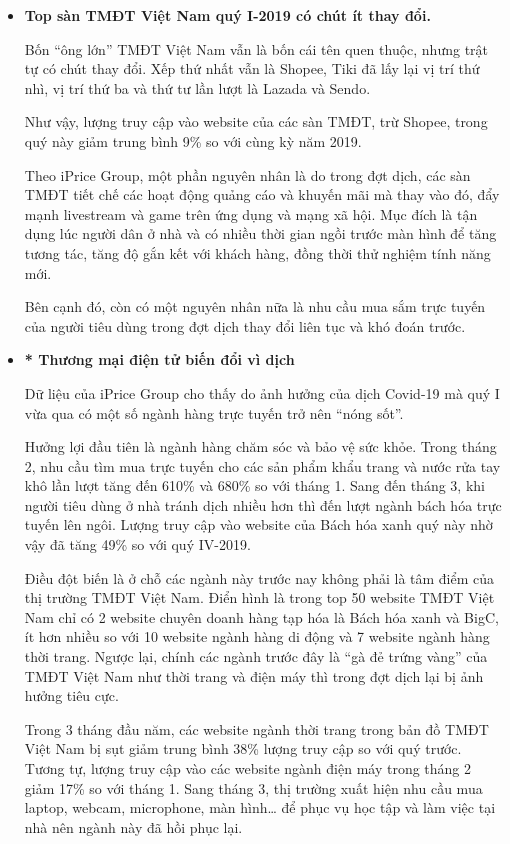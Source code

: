 \documentclass[12pt]{article}
\begin{document}
\begin{itemize}
    \item \textbf{Top sàn TMĐT Việt Nam quý I-2019 có chút ít thay đổi.}  
    
Bốn “ông lớn” TMĐT Việt Nam vẫn là bốn cái tên quen thuộc, nhưng trật tự có chút thay đổi. Xếp thứ nhất vẫn là Shopee, Tiki đã lấy lại vị trí thứ nhì, vị trí thứ ba và thứ tư lần lượt là Lazada và Sendo.

Như vậy, lượng truy cập vào website của các sàn TMĐT, trừ Shopee, trong quý này giảm trung bình 9\% so với cùng kỳ năm 2019.

Theo iPrice Group, một phần nguyên nhân là do trong đợt dịch, các sàn TMĐT tiết chế các hoạt động quảng cáo và khuyến mãi mà thay vào đó, đẩy mạnh livestream và game trên ứng dụng và mạng xã hội. Mục đích là tận dụng lúc người dân ở nhà và có nhiều thời gian ngồi trước màn hình để tăng tương tác, tăng độ gắn kết với khách hàng, đồng thời thử nghiệm tính năng mới.

Bên cạnh đó, còn có một nguyên nhân nữa là nhu cầu mua sắm trực tuyến của người tiêu dùng trong đợt dịch thay đổi liên tục và khó đoán trước.
\item \textbf{* Thương mại điện tử biến đổi vì dịch}

Dữ liệu của iPrice Group cho thấy do ảnh hưởng của dịch Covid-19 mà quý I vừa qua có một số ngành hàng trực tuyến trở nên “nóng sốt”.

Hưởng lợi đầu tiên là ngành hàng chăm sóc và bảo vệ sức khỏe. Trong tháng 2, nhu cầu tìm mua trực tuyến cho các sản phẩm khẩu trang và nước rửa tay khô lần lượt tăng đến 610\% và 680\% so với tháng 1. Sang đến tháng 3, khi người tiêu dùng ở nhà tránh dịch nhiều hơn thì đến lượt ngành bách hóa trực tuyến lên ngôi. Lượng truy cập vào website của Bách hóa xanh quý này nhờ vậy đã tăng 49\% so với quý IV-2019.

Điều đột biến là ở chỗ các ngành này trước nay không phải là tâm điểm của thị trường TMĐT Việt Nam. Điển hình là trong top 50 website TMĐT Việt Nam chỉ có 2 website chuyên doanh hàng tạp hóa là Bách hóa xanh và BigC, ít hơn nhiều so với 10 website ngành hàng di động và 7 website ngành hàng thời trang. Ngược lại, chính các ngành trước đây là “gà đẻ trứng vàng” của TMĐT Việt Nam như thời trang và điện máy thì trong đợt dịch lại bị ảnh hưởng tiêu cực.

Trong 3 tháng đầu năm, các website ngành thời trang trong bản đồ TMĐT Việt Nam bị sụt giảm trung bình 38\% lượng truy cập so với quý trước. Tương tự, lượng truy cập vào các website ngành điện máy trong tháng 2 giảm 17\% so với tháng 1. Sang tháng 3, thị trường xuất hiện nhu cầu mua laptop, webcam, microphone, màn hình… để phục vụ học tập và làm việc tại nhà nên ngành này đã hồi phục lại.


\end{itemize}
\end{document}
